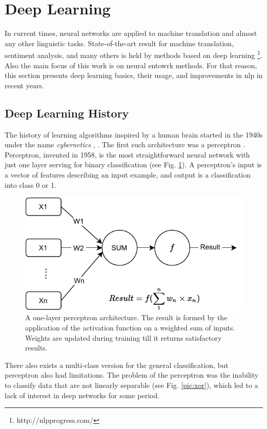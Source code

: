 \section{Deep Learning}
In current times, neural networks are applied to machine translation and almost any other linguistic tasks. State-of-the-art result for machine translation, sentiment analysis, and many others is held by methods based on deep learning \footnote{http://\acrshort{nlp}progress.com/}. Also the main focus of this work is on neural entowrk methods. For that reason, this section presents deep learning basics, their usage, and improvements in \acrshort{nlp} in recent years. 

\subsection{Deep Learning History}
The history of learning algorithms inspired by a human brain started in the 1940s under the name \textit{cybernetics} \citep{Goodfellow-et-al-2016}, \citep{McCulloch}. The first such architecture was a perceptron \citep{Rosenblatt1958}.
Perceptron, invented in 1958, is the most straightforward neural network with just one layer serving for binary classification (see Fig. \ref{pic:perceptron}). A perceptron's input is a vector of features describing an input example, and output is a classification into class 0 or 1.

\begin{figure}[H]
\centering
\includegraphics[width=0.8\columnwidth]{../img/perceptron}
\caption{A one-layer perceptron architecture. The result is formed by the application of the activation function on a weighted sum of inputs. Weights are updated during training till it returns satisfactory results. }
\label{pic:perceptron}
\end{figure}

There also exists a multi-class version for the general classification,  but perceptron also had limitations. The problem of the perceptron was the inability to classify data that are not linearly separable \citep{Minsky2017} (see Fig. \ref{pic:xor}), which led to a lack of interest in deep networks for some period.

